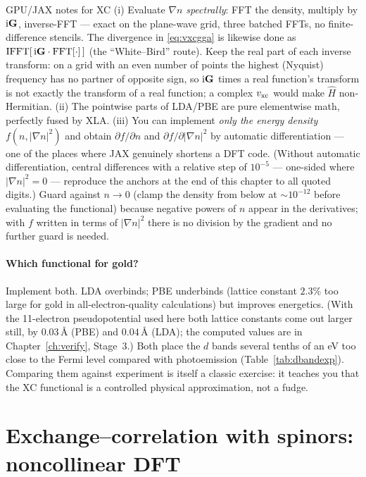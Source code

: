 \begin{gpubox}{GPU/JAX notes for XC}
(i) Evaluate $\nabla n$ \emph{spectrally}: FFT the density,
multiply by $\mathrm{i} \mathbf{G}$, inverse-FFT --- exact on the plane-wave grid, three
batched FFTs, no finite-difference stencils. The divergence in
\eqref{eq:vxcgga} is likewise done as $\mathrm{IFFT}[\,\mathrm{i}\mathbf{G}\cdot
\mathrm{FFT}[\cdot]\,]$ (the ``White--Bird'' route). Keep the real part of
each inverse transform: on a grid with an even number of points the highest
(Nyquist) frequency has no partner of opposite sign, so $\mathrm{i}\mathbf{G}$ times a
real function's transform is not exactly the transform of a real function;
a complex $v_{\mathrm{xc}}$ would make $\hat H$ non-Hermitian. (ii) The pointwise parts
of LDA/PBE are pure elementwise math, perfectly fused by XLA. (iii) You can
implement \emph{only the energy density} $f(n, |\nabla n|^2)$ and obtain
$\partial f/\partial n$ and $\partial f/\partial |\nabla n|^2$ by automatic
differentiation --- one of the places where JAX genuinely shortens a DFT
code. (Without automatic differentiation, central differences with a
relative step of $10^{-5}$ --- one-sided where $|\nabla n|^2 = 0$ ---
reproduce the anchors at the end of this chapter to all quoted digits.) Guard against $n \to 0$ (clamp the density from below at
$\sim10^{-12}$ before evaluating the functional) because negative powers
of $n$ appear in the derivatives; with $f$ written in terms of
$|\nabla n|^2$ there is no division by the gradient and no further guard
is needed.
\end{gpubox}

\paragraph{Which functional for gold?} Implement both. LDA overbinds; PBE
underbinds (lattice constant
$2.3\%$ too large for gold in all-electron-quality calculations) but
improves energetics. (With the 11-electron pseudopotential used here both
lattice constants come out larger still, by $0.03$\,\AA{} (PBE) and
$0.04$\,\AA{} (LDA); the
computed values are in Chapter~\ref{ch:verify}, Stage~3.) Both place the $d$ bands several tenths of an eV too
close to the Fermi level compared with photoemission (Table~\ref{tab:dbandexp}). Comparing them
against experiment is itself a classic exercise: it teaches you that the XC
functional is a controlled physical approximation, not a fudge.

\section{Exchange--correlation with spinors: noncollinear DFT}
\label{sec:noncollinear_xc}

